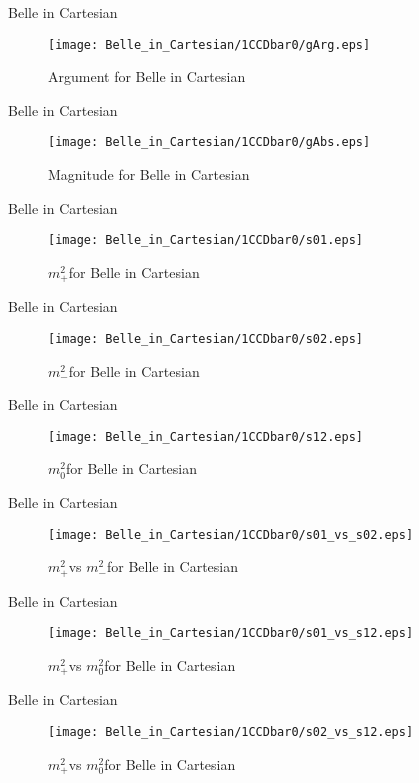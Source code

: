 \documentclass{beamer}
\newcommand{\MP}{\ensuremath{m^2_+}}
\newcommand{\MM}{\ensuremath{m^2_-}}
\newcommand{\MZ}{\ensuremath{m^2_0}}
\begin{document}
\begin{frame}{Belle in Cartesian}
\begin{figure}
\texttt{[image: Belle\_in\_Cartesian/1CCDbar0/gArg.eps]}
\caption{Argument for Belle in Cartesian}
\end{figure}
\end{frame}
\begin{frame}{Belle in Cartesian}
\begin{figure}
\texttt{[image: Belle\_in\_Cartesian/1CCDbar0/gAbs.eps]}
\caption{Magnitude for Belle in Cartesian}
\end{figure}
\end{frame}
\begin{frame}{Belle in Cartesian}
\begin{figure}
\texttt{[image: Belle\_in\_Cartesian/1CCDbar0/s01.eps]}
\caption{\MP for Belle in Cartesian}
\end{figure}
\end{frame}
\begin{frame}{Belle in Cartesian}
\begin{figure}
\texttt{[image: Belle\_in\_Cartesian/1CCDbar0/s02.eps]}
\caption{\MM for Belle in Cartesian}
\end{figure}
\end{frame}
\begin{frame}{Belle in Cartesian}
\begin{figure}
\texttt{[image: Belle\_in\_Cartesian/1CCDbar0/s12.eps]}
\caption{\MZ for Belle in Cartesian}
\end{figure}
\end{frame}
\begin{frame}{Belle in Cartesian}
\begin{figure}
\texttt{[image: Belle\_in\_Cartesian/1CCDbar0/s01\_vs\_s02.eps]}
\caption{\MP vs \MM for Belle in Cartesian}
\end{figure}
\end{frame}
\begin{frame}{Belle in Cartesian}
\begin{figure}
\texttt{[image: Belle\_in\_Cartesian/1CCDbar0/s01\_vs\_s12.eps]}
\caption{\MP vs \MZ for Belle in Cartesian}
\end{figure}
\end{frame}
\begin{frame}{Belle in Cartesian}
\begin{figure}
\texttt{[image: Belle\_in\_Cartesian/1CCDbar0/s02\_vs\_s12.eps]}
\caption{\MP vs \MZ for Belle in Cartesian}
\end{figure}
\end{frame}
\end{document}
